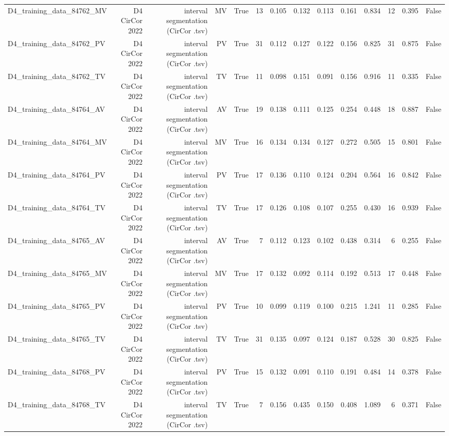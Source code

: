\begin{table}[htbp]
\begin{tabular}{lrrrrrrrrrrrrr}
    D4\_training\_data\_84762\_MV & D4 CirCor 2022 & interval segmentation (CirCor .tsv) & MV & True & 13 & 0.105 & 0.132 & 0.113 & 0.161 & 0.834 & 12 & 0.395 & False \\
    D4\_training\_data\_84762\_PV & D4 CirCor 2022 & interval segmentation (CirCor .tsv) & PV & True & 31 & 0.112 & 0.127 & 0.122 & 0.156 & 0.825 & 31 & 0.875 & False \\
    D4\_training\_data\_84762\_TV & D4 CirCor 2022 & interval segmentation (CirCor .tsv) & TV & True & 11 & 0.098 & 0.151 & 0.091 & 0.156 & 0.916 & 11 & 0.335 & False \\
    D4\_training\_data\_84764\_AV & D4 CirCor 2022 & interval segmentation (CirCor .tsv) & AV & True & 19 & 0.138 & 0.111 & 0.125 & 0.254 & 0.448 & 18 & 0.887 & False \\
    D4\_training\_data\_84764\_MV & D4 CirCor 2022 & interval segmentation (CirCor .tsv) & MV & True & 16 & 0.134 & 0.134 & 0.127 & 0.272 & 0.505 & 15 & 0.801 & False \\
    D4\_training\_data\_84764\_PV & D4 CirCor 2022 & interval segmentation (CirCor .tsv) & PV & True & 17 & 0.136 & 0.110 & 0.124 & 0.204 & 0.564 & 16 & 0.842 & False \\
    D4\_training\_data\_84764\_TV & D4 CirCor 2022 & interval segmentation (CirCor .tsv) & TV & True & 17 & 0.126 & 0.108 & 0.107 & 0.255 & 0.430 & 16 & 0.939 & False \\
    D4\_training\_data\_84765\_AV & D4 CirCor 2022 & interval segmentation (CirCor .tsv) & AV & True & 7 & 0.112 & 0.123 & 0.102 & 0.438 & 0.314 & 6 & 0.255 & False \\
    D4\_training\_data\_84765\_MV & D4 CirCor 2022 & interval segmentation (CirCor .tsv) & MV & True & 17 & 0.132 & 0.092 & 0.114 & 0.192 & 0.513 & 17 & 0.448 & False \\
    D4\_training\_data\_84765\_PV & D4 CirCor 2022 & interval segmentation (CirCor .tsv) & PV & True & 10 & 0.099 & 0.119 & 0.100 & 0.215 & 1.241 & 11 & 0.285 & False \\
    D4\_training\_data\_84765\_TV & D4 CirCor 2022 & interval segmentation (CirCor .tsv) & TV & True & 31 & 0.135 & 0.097 & 0.124 & 0.187 & 0.528 & 30 & 0.825 & False \\
    D4\_training\_data\_84768\_PV & D4 CirCor 2022 & interval segmentation (CirCor .tsv) & PV & True & 15 & 0.132 & 0.091 & 0.110 & 0.191 & 0.484 & 14 & 0.378 & False \\
    D4\_training\_data\_84768\_TV & D4 CirCor 2022 & interval segmentation (CirCor .tsv) & TV & True & 7 & 0.156 & 0.435 & 0.150 & 0.408 & 1.089 & 6 & 0.371 & False \\

\end{tabular}
\end{table}

